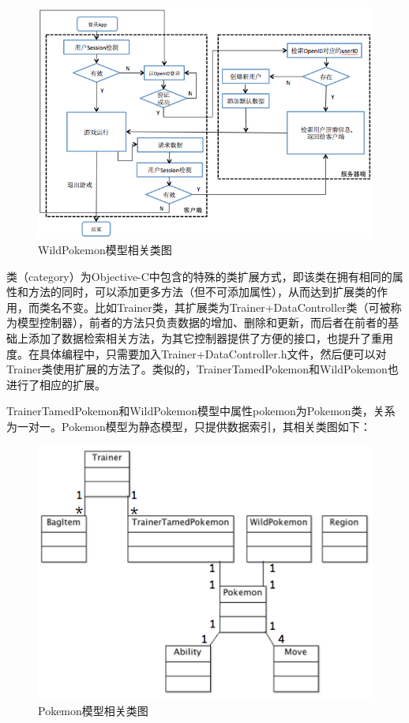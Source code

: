 \documentclass{article}
\begin{document}
\begin{CJK}{UTF8}{gbsn}
  \begin{figure}[htbp]
		\centering
		\includegraphics[bb=0 0 548 341, scale=0.45]{figure/fig_n07.png}
		\caption{WildPokemon模型相关类图}
		\label{fig:n07}
	\end{figure}

  类（category）为Objective-C中包含的特殊的类扩展方式，即该类在拥有相同的属性和方法的同时，可以添加更多方法（但不可添加属性），从而达到扩展类的作用，而类名不变。比如Trainer类，其扩展类为Trainer+DataController类（可被称为模型控制器），前者的方法只负责数据的增加、删除和更新，而后者在前者的基础上添加了数据检索相关方法，为其它控制器提供了方便的接口，也提升了重用度。在具体编程中，只需要加入Trainer+DataController.h文件，然后便可以对Trainer类使用扩展的方法了。类似的，TrainerTamedPokemon和WildPokemon也进行了相应的扩展。

  TrainerTamedPokemon和WildPokemon模型中属性pokemon为Pokemon类，关系为一对一。Pokemon模型为静态模型，只提供数据索引，其相关类图如下：

  \begin{figure}[htbp]
		\centering
		\includegraphics[bb=0 0 548 341, scale=0.45]{figure/fig_n08.png}
		\caption{Pokemon模型相关类图}
		\label{fig:n08}
	\end{figure}


\end{CJK}
\end{document}
